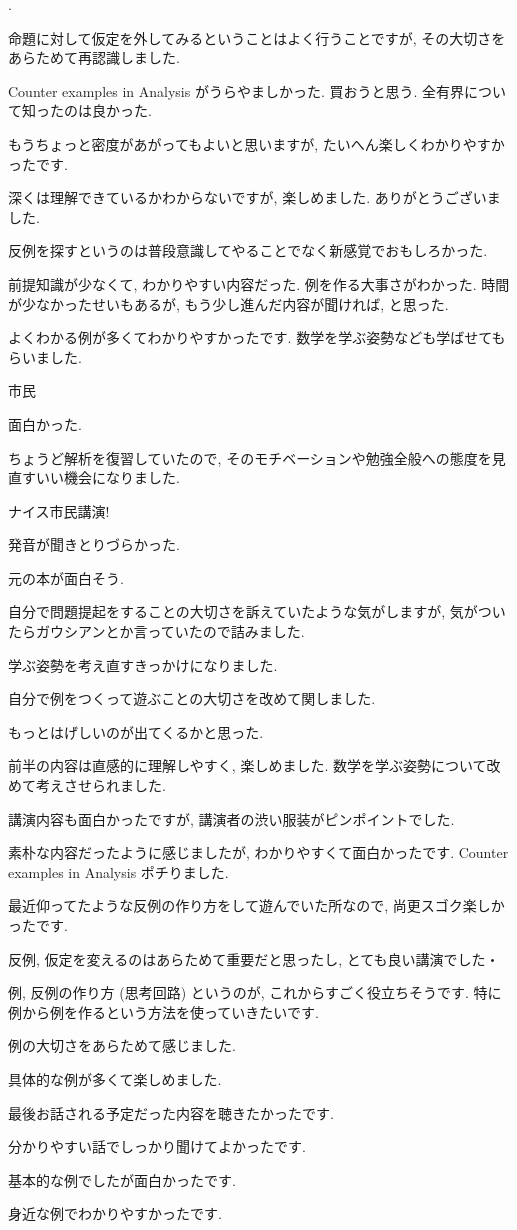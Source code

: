\documentclass[openany, a4paper, oneside]{jsbook}
\newcounter{enum2}
\renewenvironment{enumerate}{%
\begin{list}%
{%
\arabic{enum2}.\ \,%
}%
{%
\usecounter{enum2}
\setlength{\itemindent}{0pt}%
\setlength{\leftmargin}{15pt}%
\setlength{\rightmargin}{0pt}%
\setlength{\labelsep}{0pt}%
\setlength{\labelwidth}{6pt}%
\setlength{\itemsep}{0pt}%
\setlength{\parsep}{0pt}%
\setlength{\listparindent}{0pt}%
}
}{%
\end{list}%
}
\theoremstyle{break}
\theoremstyle{breakdefn}
\begin{document}
\begin{enumerate}
\item 命題に対して仮定を外してみるということはよく行うことですが, その大切さをあらためて再認識しました.
\item Counter examples in Analysis がうらやましかった. 買おうと思う. 全有界について知ったのは良かった.
\item もうちょっと密度があがってもよいと思いますが, たいへん楽しくわかりやすかったです.
\item 深くは理解できているかわからないですが, 楽しめました. ありがとうございました.
\item 反例を探すというのは普段意識してやることでなく新感覚でおもしろかった.
\item 前提知識が少なくて, わかりやすい内容だった. 例を作る大事さがわかった. 時間が少なかったせいもあるが, もう少し進んだ内容が聞ければ, と思った.
\item よくわかる例が多くてわかりやすかったです. 数学を学ぶ姿勢なども学ばせてもらいました.
\item 市民
\item 面白かった.
\item ちょうど解析を復習していたので, そのモチベーションや勉強全般への態度を見直すいい機会になりました.
\item ナイス市民講演!
\item 発音が聞きとりづらかった.
\item 元の本が面白そう.
\item 自分で問題提起をすることの大切さを訴えていたような気がしますが, 気がついたらガウシアンとか言っていたので詰みました.
\item 学ぶ姿勢を考え直すきっかけになりました.
\item 自分で例をつくって遊ぶことの大切さを改めて関しました.
\item もっとはげしいのが出てくるかと思った.
\item 前半の内容は直感的に理解しやすく, 楽しめました. 数学を学ぶ姿勢について改めて考えさせられました.
\item 講演内容も面白かったですが, 講演者の渋い服装がピンポイントでした.
\item 素朴な内容だったように感じましたが, わかりやすくて面白かったです. Counter examples in Analysis ポチりました.
\item 最近仰ってたような反例の作り方をして遊んでいた所なので, 尚更スゴク楽しかったです.
\item 反例, 仮定を変えるのはあらためて重要だと思ったし, とても良い講演でした・
\item 例, 反例の作り方 (思考回路) というのが, これからすごく役立ちそうです. 特に例から例を作るという方法を使っていきたいです.
\item 例の大切さをあらためて感じました.
\item 具体的な例が多くて楽しめました.
\item 最後お話される予定だった内容を聴きたかったです.
\item 分かりやすい話でしっかり聞けてよかったです.
\item 基本的な例でしたが面白かったです.
\item 身近な例でわかりやすかったです.
\end{enumerate}
\end{document}
